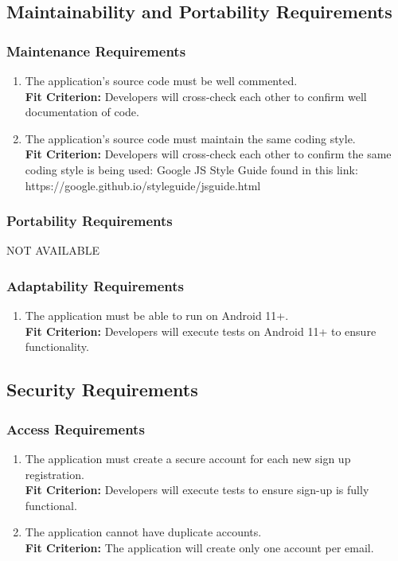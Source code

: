\documentclass[12pt,letterpaper]{article}
\begin{document}
\subsection{Maintainability and Portability Requirements}
\subsubsection{Maintenance Requirements}
\begin{enumerate}[{MP}1.] 
    \item The application's source code must be well commented. \\
    {\textbf{Fit Criterion:} Developers will cross-check each other to confirm well documentation of code. }
    \item The application's source code must maintain the same coding style. \\
    {\textbf{Fit Criterion:} Developers will cross-check each other to confirm the same coding style is being used: Google JS Style Guide found in this link: https://google.github.io/styleguide/jsguide.html }
\end{enumerate}
\subsubsection{Portability Requirements}
NOT AVAILABLE
\subsubsection{Adaptability Requirements}
\begin{enumerate}[resume*] 
    \item The application must be able to run on Android 11+. \\
    {\textbf{Fit Criterion:} Developers will execute tests on Android 11+ to ensure functionality. }
\end{enumerate}
\subsection{Security Requirements}
\subsubsection{Access Requirements}
\begin{enumerate}[{SE}1.] 
    \item The application must create a secure account for each new sign up registration. \\
    {\textbf{Fit Criterion:} Developers will execute tests to ensure sign-up is fully functional. }
    \item The application cannot have duplicate accounts.  \\
    {\textbf{Fit Criterion:} The application will create only one account per email. }
\end{enumerate}
\end{document}
